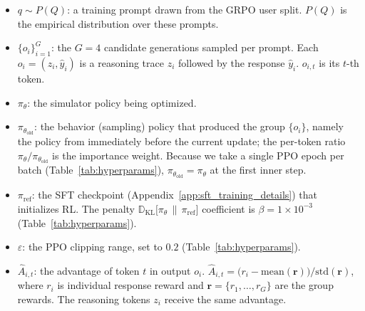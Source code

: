 \documentclass[11pt]{article}
\begin{document}
\begin{itemize}
\item $q \sim P(Q)$: a training prompt drawn from the GRPO user split. $P(Q)$ is the empirical distribution over these prompts.
\item $\{o_i\}_{i=1}^{G}$: the $G=4$ candidate generations sampled per prompt. Each $o_i = (z_i, \hat{y}_i)$ is a reasoning trace $z_i$ followed by the response $\hat{y}_i$. $o_{i,t}$ is its $t$-th token.
\item $\pi_\theta$: the simulator policy being optimized.
\item $\pi_{\theta_{\mathrm{old}}}$: the behavior (sampling) policy that produced the group $\{o_i\}$, namely the policy from immediately before the current update; the per-token ratio $\pi_\theta/\pi_{\theta_{\mathrm{old}}}$ is the importance weight. Because we take a single PPO epoch per batch (Table~\ref{tab:hyperparams}), $\pi_{\theta_{\mathrm{old}}}=\pi_\theta$ at the first inner step.
\item $\pi_{\mathrm{ref}}$: the SFT checkpoint (Appendix~\ref{app:sft_training_details}) that initializes RL. The penalty $\mathbb{D}_{\mathrm{KL}}\!\big[\pi_\theta \,\|\, \pi_{\mathrm{ref}}\big]$ coefficient is $\beta=1\times10^{-3}$ (Table~\ref{tab:hyperparams}).
\item $\varepsilon$: the PPO clipping range, set to $0.2$ (Table~\ref{tab:hyperparams}).
\item $\hat{A}_{i,t}$: the advantage of token $t$ in output $o_i$. $\hat{A}_{i,t}=\big(r_i-\mathrm{mean}(\mathbf{r})\big)/\mathrm{std}(\mathbf{r})$, where $r_i$ is individual response reward and $\mathbf{r}=\{r_1,\dots,r_G\}$ are the group rewards. The reasoning tokens $z_i$ receive the same advantage.
\end{itemize}
\end{document}
